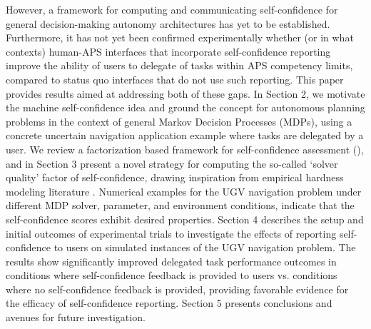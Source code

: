 However, a framework for computing and communicating self-confidence for general decision-making autonomy architectures has yet to be established.  Furthermore, it has not yet been confirmed experimentally whether (or in what contexts) human-APS interfaces that incorporate self-confidence reporting improve the ability of users to delegate of tasks within APS competency limits, compared to status quo interfaces that do not use such reporting. 
This paper provides results aimed at addressing both of these gaps. 
In Section 2, we motivate the machine self-confidence idea and ground the concept for autonomous planning problems in the context of general Markov Decision Processes (MDPs), using a concrete uncertain navigation application example where tasks are delegated by a user. We review a factorization based framework for self-confidence assessment (\famsec), and in Section 3 present a novel strategy for computing the so-called `solver quality' factor of self-confidence, drawing inspiration from empirical hardness modeling literature \cite{Leyton-Brown2009-yr}. Numerical examples for the UGV navigation problem under different MDP solver, parameter, and environment conditions, indicate that the self-confidence scores exhibit desired properties. Section 4 describes the setup and initial outcomes of experimental trials to investigate the effects of reporting self-confidence to users on simulated instances of the UGV navigation problem. The results show significantly improved delegated task performance outcomes in conditions where self-confidence feedback is provided to users vs. conditions where no self-confidence feedback is provided, providing favorable evidence for the efficacy of self-confidence reporting. Section 5 presents conclusions and avenues for future investigation. %
